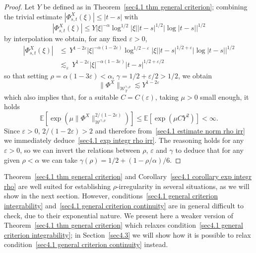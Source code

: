 \documentclass[10pt]{article}
\begin{document}
\begin{proof}
  Let $Y$ be defined as in Theorem~\ref{sec4.1 thm general criterion};
  combining the trivial estimate $| \Phi^X_{s, t} (\xi) | \leqslant | t - s |$
  with
  \[ | \Phi^X_{s, t} (\xi) | \leqslant Y | \xi |^{- \alpha} \log^{1 / 2} |
     \xi |  | t - s |^{1 / 2}  | \log | t - s | |^{1 / 2} \]
  by interpolation we obtain, for any fixed $\varepsilon > 0$,
%  
  \begin{align}
    | \Phi^X_{s, t} (\xi) | & \leqslant \, Y^{1 - 2 \varepsilon}  | \xi |^{-
    \alpha (1 - 2 \varepsilon)} \log^{1 / 2 - \varepsilon} | \xi |  | t - s
    |^{1 / 2 + \varepsilon}  | \log | t - s | |^{1 / 2} \nonumber\\
    & \lesssim_{\varepsilon} \, Y^{1 - 2 \varepsilon} | \xi |^{- \alpha (1 -
    3 \varepsilon)}  | t - s |^{1 / 2 + \varepsilon / 2} \nonumber
  \end{align}
%  
  so that setting $\rho = \alpha (1 - 3 \varepsilon) < \alpha$, $\gamma = 1 /
  2 + \varepsilon / 2 > 1 / 2$, we obtain
  \[ \| \Phi^X \|_{\mathcal{W}^{\gamma, \rho}_T} \lesssim Y^{1 - 2
     \varepsilon} \]
  which also implies that, for a suitable $C = C (\varepsilon)$, taking $\mu >
  0$ small enough, it holds
  \begin{equation}
    \mathbb{E} [\exp (\mu \| \Phi^X \|_{\mathcal{W}^{\gamma, \rho}}^{2 / (1 -
    2 \varepsilon)})] \leqslant \mathbb{E} [\exp (\mu C Y^2)] < \infty .
    \label{sec4.1 estimate norm rho irr}
  \end{equation}
  Since $\varepsilon > 0$, $2 / (1 - 2 \varepsilon) > 2$ and therefore
  from~\eqref{sec4.1 estimate norm rho irr} we immediately
  deduce~\eqref{sec4.1 exp integr rho irr}. The reasoning holds for any
  $\varepsilon > 0$, so we can invert the relations between $\rho$,
  $\varepsilon$ and $\gamma$ to deduce that for any given $\rho < \alpha$ we
  can take $\gamma (\rho) = 1 / 2 + (1 - \rho / \alpha) / 6$.
\end{proof}

Theorem~\ref{sec4.1 thm general criterion} and Corollary~\ref{sec4.1 corollary
exp integr rho} are well suited for establishing $\rho$\mbox{-}irregularity in
several situations, as we will show in the next section. However,
conditions~\eqref{sec4.1 general criterion integrability} and~\eqref{sec4.1
general criterion continuity} are in general difficult to check, due to their
exponential nature. We present here a weaker version of Theorem~\ref{sec4.1
thm general criterion} which relaxes condition~\eqref{sec4.1 general criterion
integrability}; in Section~\ref{sec4.3} we will show how it is possible to
relax condition~\eqref{sec4.1 general criterion continuity} instead.
\end{document}
